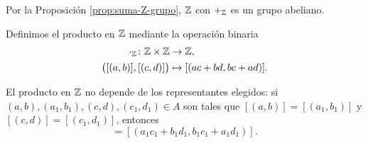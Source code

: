 \documentclass[12pt,a4paper]{book}
\begin{document}
    \begin{ejemplo}
        Por la Proposición \ref{prop:suma-Z-grupo}, $\Z$ con $+_{\mathbb{Z}}$ es un grupo abeliano.
    \end{ejemplo}

    \begin{definicion}[Producto en $\Z$]
        \label{def:producto-Z}
        Definimos el producto en $\Z$ mediante la operación binaria
        \begin{align*}
            \cdot_{\mathbb{Z}}\colon\mathbb{Z}\times\mathbb{Z}&\to\mathbb{Z},\\
            \big([(a,b)],[(c,d)]\big)&\mapsto[(ac+bd,bc+ad)].
        \end{align*}
    \end{definicion}

    \begin{proposicion}
        \label{prop:producto-Z-bien-definido}
        El producto en $\Z$ no depende de los representantes elegidos: si $(a,b),(a_{1},b_{1}),(c,d),(c_{1},d_{1})\in A$ son tales que $[(a,b)]=[(a_{1},b_{1})]$ y $[(c,d)]=[(c_{1},d_{1})]$, entonces
        \begin{equation*}
            [(ac+bd,bc+ad)] = [(a_{1}c_{1}+b_{1}d_{1},b_{1}c_{1}+a_{1}d_{1})].
        \end{equation*}
    \end{proposicion}
\end{document}
